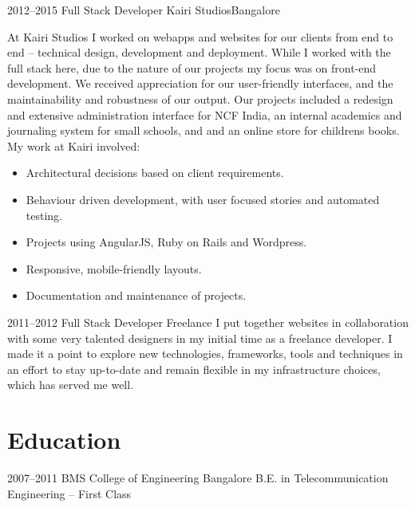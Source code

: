 \documentclass[10pt,a4paper,sans]{moderncv}        %
\begin{document}
\cventry
{\textcolor{light}{2012--2015}}
{Full Stack Developer}
{}
{Kairi Studios}{Bangalore}
{At Kairi Studios I worked on webapps and websites for our clients from end to end -- technical design, development and deployment. While I worked with the full stack here, due to the nature of our projects my focus was on front-end development. We received appreciation for our user-friendly interfaces, and the maintainability and robustness of our output.
\endgraf
\vspace{6pt}
Our projects included a redesign and extensive administration interface for NCF India, an internal academics and journaling system for small schools, and and an online store for childrens books. My work at Kairi involved:
\vspace{6pt}
\begin{itemize}
  \item Architectural decisions based on client requirements.
  \item Behaviour driven development, with user focused stories and automated testing.
  \item Projects using AngularJS, Ruby on Rails and Wordpress.
  \item Responsive, mobile-friendly layouts.
  \item Documentation and maintenance of projects.
\end{itemize}}

\vspace{8pt}

\cventry
{\textcolor{light}{2011--2012}}
{Full Stack Developer}
{}
{Freelance}{}
{I put together websites in collaboration with some very talented designers in my initial time as a freelance developer. I made it a point to explore new technologies, frameworks, tools and techniques in an effort to stay up-to-date and remain flexible in my infrastructure choices, which has served me well.}

\vspace{10pt}

\section{Education}

\vspace{6pt}

\cventry
{\textcolor{light}{2007--2011}}
{BMS College of Engineering}
{Bangalore}
{}
{}
{B.E. in Telecommunication Engineering -- First Class}

\vspace{6pt}
\end{document}
